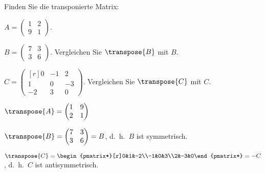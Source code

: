 Finden Sie die transponierte Matrix:
\begin{teilaufgaben}
\item
$A=\begin{pmatrix} 1&2\\9&1\end{pmatrix}$.
\item
$B=\begin{pmatrix} 7&3\\3&6\end{pmatrix}$.
Vergleichen Sie
$\transpose{B}$
mit
$B$.
\item
$C=\begin{pmatrix*}[r] 0&-1&2\\1&0&-3\\-2&3&0\end{pmatrix*}$.
Vergleichen Sie
$\transpose{C}$
mit
$C$.
\end{teilaufgaben}

\begin{loesung}
\begin{teilaufgaben}
\item
$\transpose{A} = \begin{pmatrix}1&9\\2&1\end{pmatrix}$
\item
$\transpose{B} = \begin{pmatrix}7&3\\3&6\end{pmatrix}=B$,
d.~h.~$B$ ist symmetrisch.
\item
$\transpose{C} = \begin{pmatrix*}[r]0&1&-2\\-1&0&3\\2&-3&0\end{pmatrix*}=-C$,
d.~h.~$C$ ist antisymmetrisch.
\qedhere
\end{teilaufgaben}
\end{loesung}
